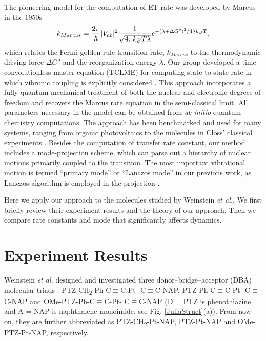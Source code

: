 The pioneering model for the computation of ET rate was developed by Marcus in the 1950s \cite{marcus1956theory,marcus1965theory,marcus1993electron}
\begin{equation}
k_{Marcus}=\frac{2\pi}{\hbar}|V_{ab}|^{2}\frac{1}{\sqrt{4\text{\ensuremath{\pi}}k_{B}T\lambda}}e^{-(\lambda+ \Delta G^{o})^{2}/4\text{\ensuremath{\lambda}}k_{B}T},
\end{equation}
which relates the Fermi golden-rule transition rate, $k_{Marcus}$
to the thermodynamic driving force $\Delta G^{o}$ and the reorganization energy $\lambda$. Our group developed a time-convolutionless  master equation (TCLME) for computing state-to-state rate in which vibronic coupling is explicitly considered \cite{pereverzev2006time}. This approach incorporates a fully quantum
mechanical treatment of both the nuclear and electronic degrees of freedom and recovers
the Marcus rate equation in the semi-classical limit.  All parameters necessary in the model can be obtained from {\em ab initio} quantum  chemistry computations.
The approach has been benchmarked and used for many systems, ranging from organic photovoltaics to the molecules in Closs' classical experiments \cite{tamura2008phonon,tamura2007exciton,singh2009fluorescence,bittner2014noise,yang2014intramolecular,yang2015computing}. Besides the computation of transfer rate constant, our method includes a  mode-projection scheme, which can parse out a hierarchy of nuclear motions primarily coupled to the transition. The most important vibrational motion is termed ``primary mode'' or ``Lanczos mode'' in our previous work, as Lanczos algorithm is employed in the projection \cite{yang2014intramolecular,yang2015computing}.

Here we apply our approach to the molecules studied by Weinstein {\em et al.}. We first briefly review their experiment results and the theory of our approach. Then we compare  rate constants and mode that significantly affects dynamics.


\section{Experiment Results}

Weinstein {\em et al.} designed and investigated three donor–bridge–acceptor (DBA) molecular triads \cite{delor2014toward,delor2015mechanism,scattergood2014electron}: PTZ-CH\textsubscript{2}-Ph-C$\equiv$C-Pt- C$\equiv$C-NAP, PTZ-Ph-C$\equiv$C-Pt- C$\equiv$C-NAP and OMe-PTZ-Ph-C$\equiv$C-Pt- C$\equiv$C-NAP (D = PTZ is phenothiazine and A = NAP is naphthalene-monoimide, see Fig. \ref{JuliaStruct}(a)). From now on, they are further abbreviated as PTZ-CH\textsubscript{2}-Pt-NAP, PTZ-Pt-NAP and OMe-PTZ-Pt-NAP, respectively.

